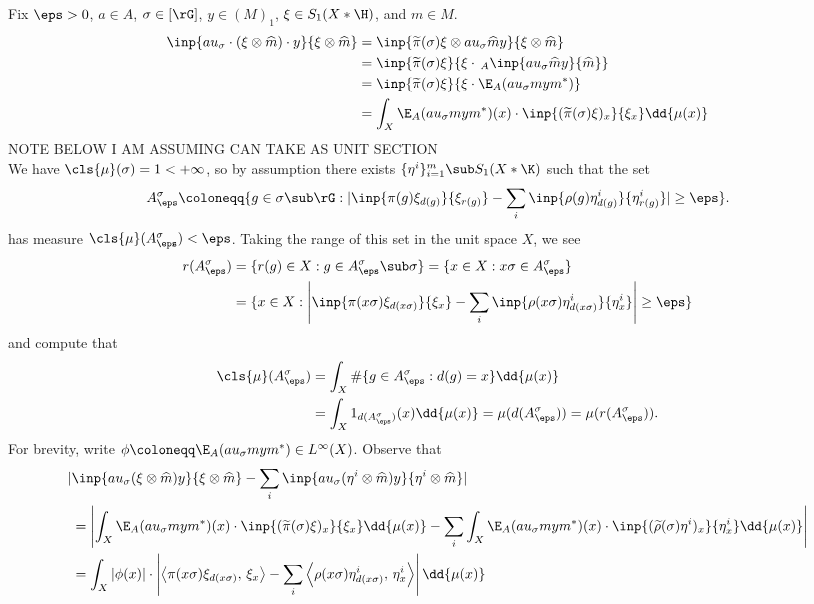 \documentclass[../main.tex]{subfiles}
\begin{document}
Fix $ \eps>0 $, $ a\in A $, $ \sigma\in [\rG] $, $ y\in (M)_{1} $, $ \xi\in S_{1}(X\ast \H) $, and $ m\in M $.
\begin{align*}
    \inp{au_{\sigma}\cdot ( \xi \otimes \widehat{m}) \cdot y}{ \xi \otimes  \widehat{m}} &= \inp{\widetilde{\pi}(\sigma) \xi \otimes  au_{\sigma} \widehat{m} y}{ \xi \otimes \widehat{m}}\\
    &= \inp{\widetilde{\pi}(\sigma) \xi}{ \xi \cdot\, _A \inp{au_{\sigma} \widehat{m}y}{\widehat{m}}}\\
    &= \inp{\widetilde{\pi}(\sigma) \xi}{ \xi \cdot \E_{A}(au_{\sigma} mym^{*})}\\
    &= \int_{X}\E_{A}(au_{\sigma} mym^{*})(x) \cdot \inp{(\widetilde{\pi}(\sigma) \xi)_{x}}{\xi_{x}}\dd{\mu(x)}
\end{align*}
NOTE BELOW I AM ASSUMING CAN TAKE AS UNIT SECTION\\
We have $ \cls{\mu}(\sigma) =1 <+\infty $, so by assumption there exists $ \{\eta^{i}\}_{i=1}^{m}\sub S_{1}(X \ast \K) $ such that the set  
\[
    A^{\sigma}_{\eps} \coloneqq \{g\in \sigma\sub \rG : |\inp{\pi(g) \xi_{d(g)}}{\xi_{r(g)}} - \sum_{i}\inp{\rho(g) \eta^{i}_{d(g)}}{\eta^{i}_{r(g)}}|\geq \eps\}.
\]
has measure $ \cls{\mu}(A^{\sigma}_{\eps})<\eps $. Taking the range of this set in the unit space $ X $, we see
\begin{align*}
    r(A^{\sigma}_{\eps}) &= \{r(g)\in X : g\in A^{\sigma}_{\eps}\sub \sigma\}= \{x\in X: x \sigma \in A^{\sigma}_{\eps}\}\\
    &=\{x\in X: \left|\inp{\pi(x \sigma) \xi_{d(x \sigma)}}{\xi_{x}} - \sum_{i}\inp{\rho( x \sigma) \eta^{i}_{d( x \sigma)}}{\eta^{i}_{x}}\right|\geq \eps\}
\end{align*}
and compute that 
\begin{align*}
    \cls{\mu}(A^{\sigma}_{\eps}) &= \int_{X}  \#\{g\in A^{\sigma}_{\eps}: d(g) = x\} \dd{\mu(x)}\\
    &=\int_{X} 1_{d(A^{\sigma}_{\eps})}(x) \dd{\mu(x)} = \mu(d(A^{\sigma}_{\eps})) = \mu(r(A^{\sigma}_{\eps})).
\end{align*}
For brevity, write $ \phi\coloneqq \E_{A}(au_{\sigma}mym^{*})\in L^{\infty}(X) $. Observe that
\begin{align*}
    | & \inp{au_{\sigma}(\xi \otimes \widehat{m}) y}{\xi \otimes \widehat{m}} - \sum_{i}\inp{au_{\sigma} (\eta^{i}\otimes \widehat{m})y}{\eta^{i} \otimes \widehat{m}}|  \\ 
    &=\left|\int_{X}\E_{A}(au_{\sigma} mym^{*})(x) \cdot \inp{(\widetilde{\pi}(\sigma) \xi)_{x}}{\xi_{x}}\dd{\mu(x)} - \sum_{i} \int_{X}\E_{A}(au_{\sigma} mym^{*})(x) \cdot \inp{(\widetilde{\rho}(\sigma) \eta^{i})_{x}}{\eta^{i}_{x}}\dd{\mu(x)} \right|\\
    &=\int_{X}| \phi(x)| \cdot\left| \left\langle\pi(x \sigma) \xi_{d(x \sigma)},\,\xi_{x}\right\rangle - \sum_{i}  \left\langle\rho(x \sigma) \eta^{i}_{d(x \sigma)},\,\eta^{i}_{x}\right\rangle\right|\dd{\mu(x)} 
\end{align*}
\end{document}
